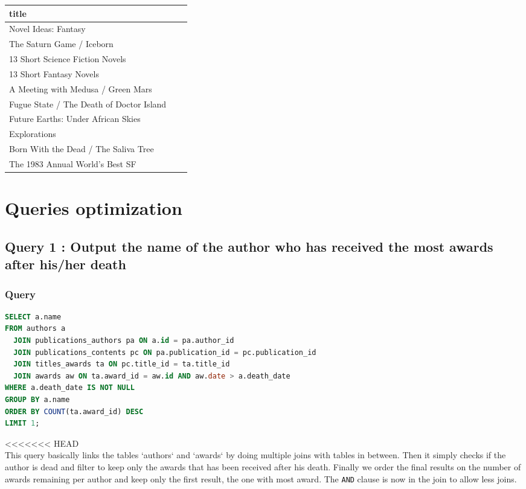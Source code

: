 \documentclass[doubleside, titlepage]{article}
\begin{document}
\begin{enumerate}
	\begin{tabular}{|l|c|r|}
	  \hline
		title\\
	  \hline
Novel Ideas: Fantasy\\
The Saturn Game / Iceborn\\
13 Short Science Fiction Novels\\
13 Short Fantasy Novels\\
A Meeting with Medusa / Green Mars\\
Fugue State / The Death of Doctor Island\\
Future Earths: Under African Skies\\
Explorations\\
Born With the Dead / The Saliva Tree\\
The 1983 Annual World's Best SF\\
	  \hline
	\end{tabular}
\end{enumerate}

\newpage

\section{Queries optimization}

\subsection{Query 1 : Output the name of the author who has received the most awards after his/her death}

\subsubsection{Query}
		\begin{lstlisting}[language=SQL,showspaces=false,basicstyle=\ttfamily,numberstyle=\tiny,commentstyle=\color{gray}]
SELECT a.name
FROM authors a
  JOIN publications_authors pa ON a.id = pa.author_id
  JOIN publications_contents pc ON pa.publication_id = pc.publication_id
  JOIN titles_awards ta ON pc.title_id = ta.title_id
  JOIN awards aw ON ta.award_id = aw.id AND aw.date > a.death_date
WHERE a.death_date IS NOT NULL
GROUP BY a.name
ORDER BY COUNT(ta.award_id) DESC
LIMIT 1;
		\end{lstlisting}
<<<<<<< HEAD
~\\	
This query basically links the tables `authors` and `awards` by doing multiple joins with tables in between. Then it simply checks if the author is dead and filter to keep only the awards that has been received after his death. Finally we order the final results on the number of awards remaining per author and keep only the first result, the one with most award. The \texttt{AND} clause is now in the join to allow less joins.~\\
		
\end{document}
